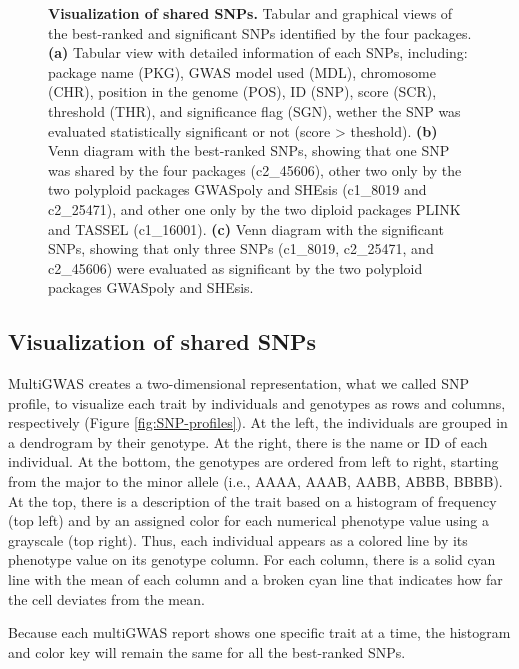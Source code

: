 \documentclass{article}
\begin{document}
\begin{figure}[H]
\caption{\scriptsize \textbf{Visualization of shared SNPs.} Tabular and graphical views of the best-ranked and significant SNPs identified by the four packages. \textbf{(a)} Tabular view with detailed information of each SNPs, including: package name (PKG), GWAS model used (MDL), chromosome (CHR), position in the genome (POS), ID (SNP), score (SCR), threshold (THR), and significance flag (SGN), wether the SNP was evaluated statistically significant or not (score > theshold). \textbf{(b)} Venn diagram with the best-ranked SNPs, showing that one SNP was shared by the four packages (c2\_45606), other two only by the two polyploid packages GWASpoly and SHEsis (c1\_8019 and c2\_25471), and other one only by the two diploid packages PLINK and TASSEL (c1\_16001). \textbf{(c)} Venn diagram with the significant SNPs, showing that only three SNPs (c1\_8019, c2\_25471, and c2\_45606) were evaluated as significant by the two polyploid packages GWASpoly and SHEsis.\label{fig:-View-Shared-SNPs}}
\end{figure}



\subsection{Visualization of shared SNPs}
MultiGWAS creates a two-dimensional representation, what we called SNP profile, to visualize each trait by individuals and genotypes as rows and columns, respectively (Figure \ref{fig:SNP-profiles}). At the left, the individuals are grouped in a dendrogram by their genotype. At the right, there is the name or ID of each individual. At the bottom, the genotypes are ordered from left to right, starting from the major to the minor allele (i.e., AAAA, AAAB, AABB, ABBB, BBBB). At the top, there is a description of the trait based on a histogram of frequency (top left) and by an assigned color for each numerical phenotype value using a grayscale (top right). Thus, each individual appears as a colored line by its phenotype value on its genotype column. For each column, there is a solid cyan line with the mean of each column and a broken cyan line that indicates how far the cell deviates from the mean.

Because each multiGWAS report shows one specific trait at a time, the histogram and color key will remain the same for all the best-ranked SNPs.
\end{document}
